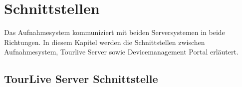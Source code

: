 \chapter{Schnittstellen}

Das Aufnahmesystem kommuniziert mit beiden Serversystemen in beide Richtungen. In diesem Kapitel werden die Schnittstellen zwischen Aufnahmesystem,  Tourlive Server sowie Devicemanagement Portal erläutert.
 

\section{TourLive Server Schnittstelle}

{\renewcommand{\arraystretch}{1.1}%
    \begin{longtable}{ p{2.5cm} p{3.5cm} p{7cm}}


\end{longtable}}
